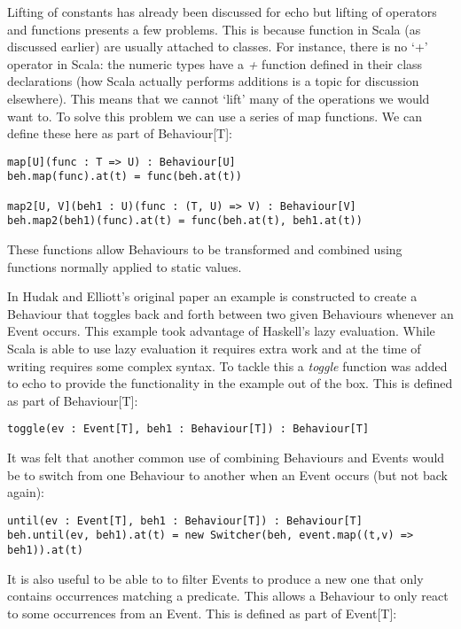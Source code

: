       Lifting of constants has already been discussed for echo but lifting of operators and
      functions presents a few problems. This is because function in Scala (as discussed earlier)
      are usually attached to classes. For instance, there is no `+' operator in Scala: the numeric
      types have a \emph{+} function defined in their class declarations (how Scala actually performs additions
      is a topic for discussion elsewhere). This means that we cannot `lift' many of the operations we
      would want to. To solve this problem we can use a series of map functions. We can define these
      here as part of Behaviour[T]:

\begin{verbatim}
map[U](func : T => U) : Behaviour[U]
beh.map(func).at(t) = func(beh.at(t))

map2[U, V](beh1 : U)(func : (T, U) => V) : Behaviour[V]
beh.map2(beh1)(func).at(t) = func(beh.at(t), beh1.at(t))
\end{verbatim}        

      These functions allow Behaviours to be transformed and combined using functions
      normally applied to static values.
      
      In Hudak and Elliott's original paper an example is constructed to create a Behaviour
      that toggles back and forth between two given Behaviours whenever an Event occurs. This
      example took advantage of Haskell's lazy evaluation. While Scala is able to use lazy evaluation
      it requires extra work and at the time of writing requires some complex syntax. To tackle this
      a \emph{toggle} function was added to echo to provide the functionality in the example out of the box.
      This is defined as part of Behaviour[T]:
      
\begin{verbatim}
toggle(ev : Event[T], beh1 : Behaviour[T]) : Behaviour[T]
\end{verbatim}        
      
      It was felt that another common use of combining Behaviours and Events would be
      to switch from one Behaviour to another when an Event occurs (but not back again):

\begin{verbatim}
until(ev : Event[T], beh1 : Behaviour[T]) : Behaviour[T]
beh.until(ev, beh1).at(t) = new Switcher(beh, event.map((t,v) => beh1)).at(t)
\end{verbatim}        
      
      It is also useful to be able to to filter Events to produce a new one that only
      contains occurrences matching a predicate. This allows a Behaviour to only react
      to some occurrences from an Event. This is defined as part of Event[T]:

